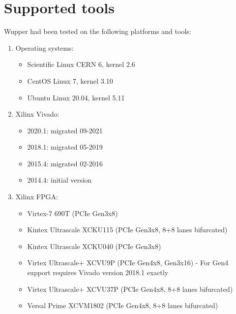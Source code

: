 \section{Supported tools}
\label{sec:supported_tools}

Wupper had been tested on the following platforms and tools:

\begin{enumerate}
\item Operating systems: 
\begin{itemize}
\item Scientific Linux CERN 6, kernel 2.6
\item CentOS Linux 7, kernel 3.10
\item Ubuntu Linux 20.04, kernel 5.11
\end{itemize}
\item Xilinx Vivado:
\begin{itemize}
\item 2020.1: migrated 09-2021
\item 2018.1: migrated 05-2019
\item 2015.4: migrated 02-2016
\item 2014.4: initial version
\end{itemize}
\item Xilinx FPGA:
\begin{itemize}
\item Virtex-7 690T (PCIe Gen3x8)
\item Kintex Ultrascale XCKU115 (PCIe Gen3x8, 8+8 lanes bifurcated)
\item Kintex Ultrascale XCKU040 (PCIe Gen3x8)
\item Virtex Ultrascale+ XCVU9P (PCIe Gen4x8, Gen3x16) - For Gen4 support requires Vivado version 2018.1 exactly
\item Virtex Ultrascale+ XCVU37P (PCIe Gen4x8, 8+8 lanes bifurcated)
\item Versal Prime XCVM1802 (PCIe Gen4x8, 8+8 lanes bifurcated)
\end{itemize}
\end{enumerate}

\newpage
